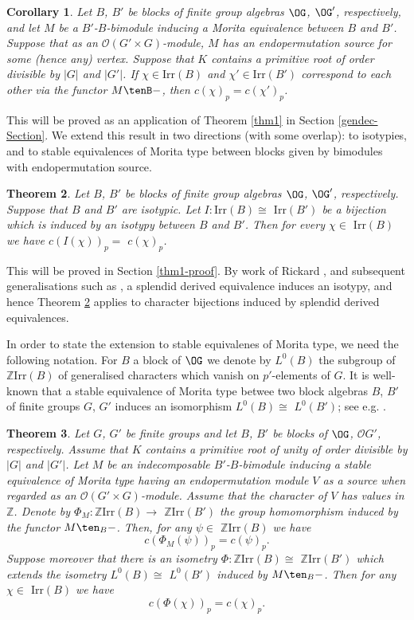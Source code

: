 \documentclass{amsart} %
\theoremstyle{plain}\newtheorem{Theorem}{Theorem}[section]
\theoremstyle{plain}\newtheorem{Conjecture}[Theorem]{Conjecture}
\theoremstyle{plain}\newtheorem{Corollary}[Theorem]{Corollary}
\theoremstyle{plain}\newtheorem{Lemma}[Theorem]{Lemma}
\theoremstyle{plain}\newtheorem{Proposition}[Theorem]{Proposition}
\theoremstyle{definition}\newtheorem{Definition}[Theorem]{Definition}
\theoremstyle{definition}\newtheorem{Example}[Theorem]{Example}
\theoremstyle{definition}\newtheorem{Examples}[Theorem]{Examples}
\theoremstyle{definition}\newtheorem{Remark}[Theorem]{Remark}
\theoremstyle{definition}\newtheorem{Remarks}[Theorem]{Remarks}
\theoremstyle{plain}\newtheorem{Statement}[Theorem]{}
\def\CO{{\mathcal{O}}}
\def\Z{{\mathbb Z}}
\def\Irr{\mathrm{Irr}}           \def\tenK{\otimes_K}
\begin{document}
\begin{Corollary} \label{Cor1}
Let $B$, $B'$ be blocks of finite group algebras $\OG$, $\OG'$, respectively,
and let $M$ be a $B'$-$B$-bimodule inducing a Morita equivalence between
$B$ and $B'$. Suppose that as an $\CO(G'\times G)$-module, $M$ has an
endopermutation source for some (hence any) vertex.  Suppose that $K$
contains a primitive root of order divisible by $|G|$ and $|G'|$.
If $\chi\in \Irr(B)$ and $\chi'\in\Irr(B')$ correspond to each other via the functor
$M\tenB-$, then $c(\chi)_p=c(\chi')_p$.
\end{Corollary}

This will be proved as an application of Theorem \ref{thm1} in 
Section \ref{gendec-Section}. 
We extend this result in two directions (with some overlap): 
to isotypies, and  to stable equivalences  of Morita type between blocks  
given by bimodules with endopermutation source. 

\begin{Theorem}\label{thm15}
Let $B$, $B'$ be blocks of finite group algebras $\OG$, $\OG'$, respectively.
Suppose that $B$ and $B'$ are isotypic.  Let $I : \Irr(B)\cong$ $\Irr(B')$ be
a bijection which is induced by an isotypy between $B$ and $B'$. Then
for every $\chi\in$ $\Irr(B)$ we have  $c(I(\chi))_p=$ $c(\chi)_p$.
\end{Theorem}

This will  be proved in Section \ref{thm1-proof}. By work of Rickard 
\cite[Section 7]{Ricksplendid}, and subsequent generalisations such as  \cite{BoXu}, 
a splendid derived equivalence induces an isotypy,  and hence Theorem
\ref{thm15} applies to character bijections induced by splendid derived equivalences.

\medskip
In order to state the extension to stable equivalenes of Morita type, we need the 
following notation.
 For $B$ a block of $\OG$ we denote by $L^0(B)$ the subgroup of 
$\Z\Irr(B)$ of generalised characters which vanish on $p'$-elements of $G$. It
is well-known that a stable equivalence of Morita type betwee two block algebras 
$B$, $B'$ of finite groups $G$, $G'$ induces an isomorphism $L^0(B)\cong$ $L^0(B')$; 
see e.g.  \cite[Proposition 3.1]{KL10}.

\begin{Theorem} \label{thm2}
Let $G$, $G'$ be finite groups and let $B$, $B'$ be blocks of $\OG$, $\CO G'$,
respectively.  Assume that $K$ contains a primitive root of unity of order divisible
by $|G|$ and $|G'|$.
Let $M$ be an indecomposable  $B'$-$B$-bimodule inducing a stable 
equivalence of Morita type having an endopermutation module $V$ as a source when
regarded as an $\CO(G'\times G)$-module.  Assume that the character of $V$ has
values in $\Z$. Denote by $\Phi_M : \Z\Irr(B)\to$
$\Z\Irr(B')$ the group homomorphism induced by the functor $M\ten_{B}-$.
Then, for any $\psi\in$ $\Z\Irr(B)$ we have 
$$c(\Phi_M(\psi))_p = c(\psi)_p.$$
Suppose moreover that there is an isometry $\Phi : \Z\Irr(B)\cong$ $\Z\Irr(B')$
which extends the isometry $L^0(B)\cong$ $L^0(B')$ induced by $M\ten_B-$.
 Then for any $\chi\in$  $\Irr(B)$ we have
$$c(\Phi(\chi))_p=c(\chi)_p.$$
\end{Theorem}
\end{document}
